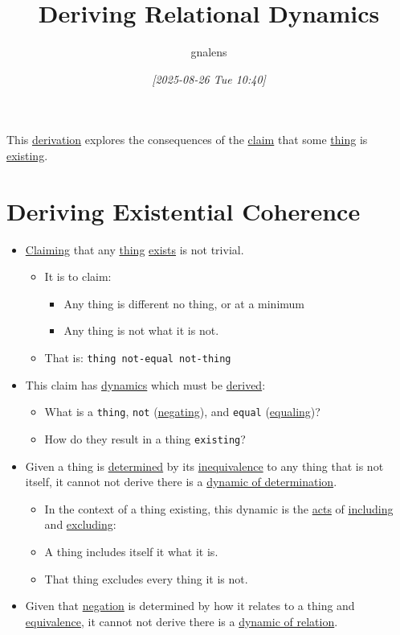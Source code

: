 \documentclass[11pt]{article}
\author{gnalens}
\date{\textit{{[}2025-08-26 Tue 10:40]}}
\title{Deriving Relational Dynamics}
\begin{document}
\maketitle
This \href{derivation.org}{derivation} explores the consequences of the \href{claim.org}{claim} that some \href{thing.org}{thing} is \href{existing.org}{existing}.
\section*{Deriving Existential Coherence}
\label{sec:org3ae291d}
\begin{itemize}
\item \href{claiming.org}{Claiming} that any \href{thing.org}{thing} \href{existing.org}{exists} is not trivial.
\begin{itemize}
\item It is to claim:
\begin{itemize}
\item Any thing is different no thing, or at a minimum
\item Any thing is not what it is not.
\end{itemize}
\item That is: \texttt{thing not-equal not-thing}
\end{itemize}
\item This claim has \href{dynamic.org}{dynamics} which must be \href{deriving.org}{derived}:
\begin{itemize}
\item What is a \texttt{thing}, \texttt{not} (\href{negating.org}{negating}), and \texttt{equal} (\href{equaling.org}{equaling})?
\item How do they result in a thing \texttt{existing}?
\end{itemize}
\item Given a thing is \href{determining.org}{determined} by its \href{inequivalent.org}{inequivalence} to any thing that is not itself, it cannot not derive there is a \href{dynamic-of-determination.org}{dynamic of determination}.
\begin{itemize}
\item In the context of a thing existing, this dynamic is the \href{act.org}{acts} of \href{including.org}{including} and \href{excluding.org}{excluding}:
\item A thing includes itself it what it is.
\item That thing excludes every thing it is not.
\end{itemize}
\item Given that \href{negation.org}{negation} is determined by how it relates to a thing and \href{equivalence.org}{equivalence}, it cannot not derive there is a \href{dynamic-of-relation.org}{dynamic of relation}.

\end{itemize}
\end{document}
